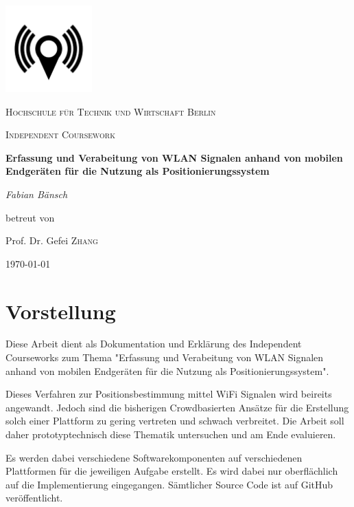 \documentclass[11pt,a4paper]{article}
\begin{document}
 


\begin{titlepage}
	\centering
	\includegraphics[width=0.25\textwidth]{pics/airsniffer.png}\par\vspace{1cm}
	{\scshape\LARGE Hochschule für Technik und Wirtschaft Berlin \par}
	\vspace{1cm}
	{\scshape\Large Independent Coursework\par}
	\vspace{1.5cm}
	{\huge\bfseries Erfassung und Verabeitung von WLAN Signalen anhand von mobilen Endgeräten für die Nutzung als Positionierungssystem\par}
	\vspace{2cm}
	{\Large\itshape Fabian Bänsch\par}
	\vfill
	betreut von\par
	Prof. Dr. Gefei \textsc{Zhang}

	\vfill

	{\large \today\par}
\end{titlepage}

\tableofcontents{}

\newpage

\section{Vorstellung}

Diese Arbeit dient als Dokumentation und Erklärung des Independent Courseworks zum Thema "Erfassung und Verabeitung von WLAN Signalen anhand von mobilen Endgeräten für die Nutzung als Positionierungssystem".

Dieses Verfahren zur Positionsbestimmung mittel WiFi Signalen wird beireits angewandt. Jedoch sind die bisherigen Crowdbasierten Ansätze für die Erstellung solch einer Plattform zu gering vertreten und schwach verbreitet. Die Arbeit soll daher prototyptechnisch diese Thematik untersuchen und am Ende evaluieren.

Es werden dabei verschiedene Softwarekomponenten auf verschiedenen Plattformen für die jeweiligen Aufgabe erstellt. Es wird dabei nur oberflächlich auf die Implementierung eingegangen. Sämtlicher Source Code ist auf GitHub~\cite{github} veröffentlicht. 
\end{document}
